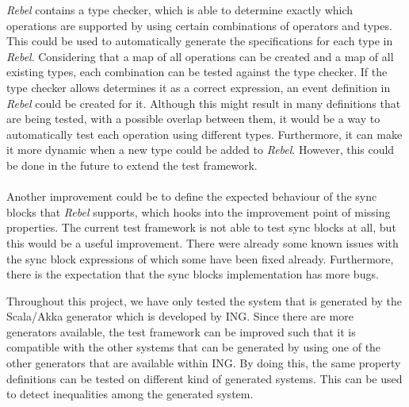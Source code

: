 \textit{Rebel} contains a type checker, which is able to determine exactly which operations are supported by using certain combinations of operators and types. This could be used to automatically generate the specifications for each type in \textit{Rebel}. Considering that a map of all operations can be created and a map of all existing types, each combination can be tested against the type checker. If the type checker allows determines it as a correct expression, an event definition in \textit{Rebel} could be created for it. Although this might result in many definitions that are being tested, with a possible overlap between them, it would be a way to automatically test each operation using different types. Furthermore, it can make it more dynamic when a new type could be added to \textit{Rebel}. However, this could be done in the future to extend the test framework.\\
\\
Another improvement could be to define the expected behaviour of the sync blocks that \textit{Rebel} supports, which hooks into the improvement point of missing properties. The current test framework is not able to test sync blocks at all, but this would be a useful improvement. There were already some known issues with the sync block expressions of which some have been fixed already. Furthermore, there is the expectation that the sync blocks implementation has more bugs.


Throughout this project, we have only tested the system that is generated by the Scala/Akka generator which is developed by ING. Since there are more generators available, the test framework can be improved such that it is compatible with the other systems that can be generated by using one of the other generators that are available within ING. By doing this, the same property definitions can be tested on different kind of generated systems. This can be used to detect inequalities among the generated system.
